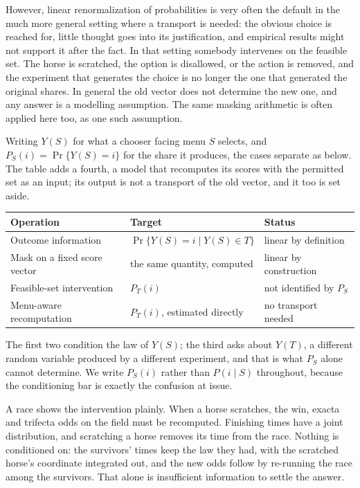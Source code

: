 \documentclass[11pt]{article}
\theoremstyle{italichead}
\begin{document}
However, linear renormalization of probabilities is very often the default in the much more
general setting where a transport is needed: the obvious choice is reached for, little thought
goes into its justification, and empirical results might not support it after the fact. In that
setting somebody intervenes on the feasible set. The horse is scratched, the option is
disallowed, or the action is removed, and the experiment that generates the choice is no longer
the one that generated the original shares. In general the old vector does not determine the new
one, and any answer is a modelling assumption. The same masking arithmetic is often applied here
too, as one such assumption.

Writing $Y(S)$ for what a chooser facing menu $S$ selects, and $P_S(i) = \Pr\{Y(S) = i\}$ for the
share it produces, the cases separate as below. The table adds a fourth, a model that recomputes its
scores with the permitted set as an input; its output is not a transport of the old vector, and
it too is set aside.
\begin{center}
\small
\begin{tabular}{lll}
\toprule
Operation & Target & Status \\
\midrule
Outcome information & $\Pr\{Y(S) = i \mid Y(S) \in T\}$ & linear by definition \\
Mask on a fixed score vector & the same quantity, computed & linear by construction \\
Feasible-set intervention & $P_T(i)$ & not identified by $P_S$ \\
Menu-aware recomputation & $P_T(i)$, estimated directly & no transport needed \\
\bottomrule
\end{tabular}
\end{center}
The first two condition the law of $Y(S)$; the third asks about $Y(T)$, a different random
variable produced by a different experiment, and that is what $P_S$ alone cannot determine. We
write $P_S(i)$ rather than $P(i \mid S)$ throughout, because the conditioning bar is exactly the
confusion at issue.

A race shows the intervention plainly. When a horse scratches, the win, exacta and trifecta
odds on the field must be recomputed. Finishing times have a joint distribution, and scratching
a horse removes its time from the race. Nothing is conditioned on: the survivors' times keep the
law they had, with the scratched horse's coordinate integrated out, and the new odds follow by
re-running the race among the survivors. That alone is insufficient information to settle the
answer.
\end{document}
